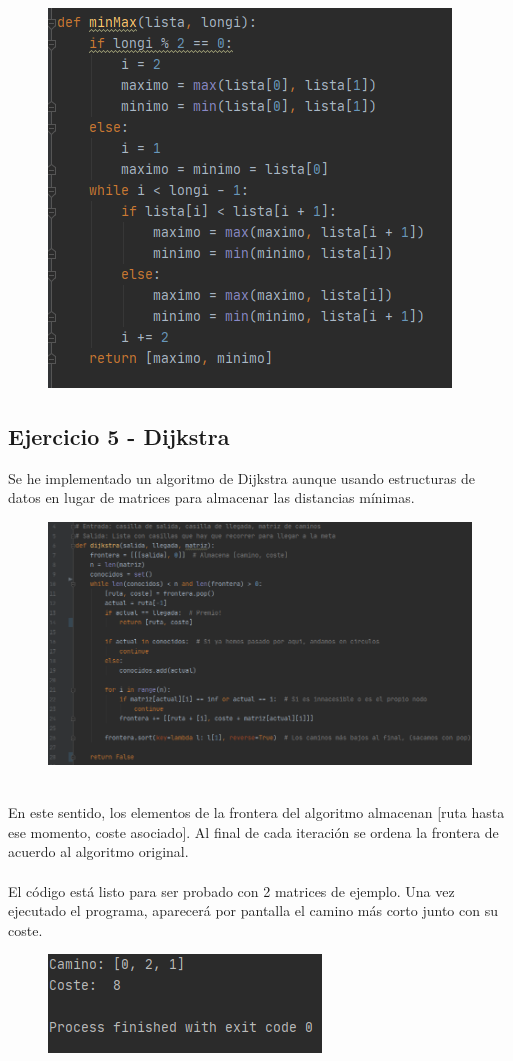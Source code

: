 \documentclass[]{report}
\begin{document}
\begin{figure}[h!]
	\centering
	\includegraphics[width=0.65\linewidth]{6}
	\caption{}
	\label{fig:6}
\end{figure}\newpage

\newpage
\subsection*{Ejercicio 5 - Dijkstra}
Se he implementado un algoritmo de Dijkstra aunque usando estructuras de datos en lugar de matrices para almacenar las distancias mínimas.\\
\begin{figure}[h!]
	\centering
	\includegraphics[width=1\linewidth]{2}
	\caption{}
	\label{fig:2}
\end{figure}\\
En este sentido, los elementos de la frontera del algoritmo almacenan [ruta hasta ese momento, coste asociado]. Al final de cada iteración se ordena la frontera de acuerdo al algoritmo original.\\\\
El código está listo para ser probado con 2 matrices de ejemplo. Una vez ejecutado el programa, aparecerá por pantalla el camino más corto junto con su coste.
\begin{figure}[h!]
	\centering
	\includegraphics[width=0.4\linewidth]{3}
	\caption{}
	\label{fig:3}
\end{figure}
\newpage
\end{document}
